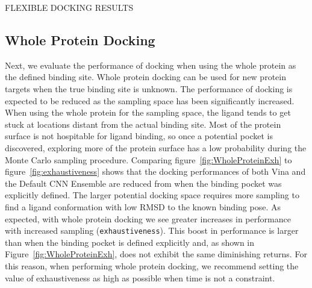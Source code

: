 \documentclass[journal=jcisd8,manuscript=article]{achemso}
\begin{document}
FLEXIBLE DOCKING RESULTS

\subsection{Whole Protein Docking}

Next, we evaluate the performance of docking when using the whole protein as the defined binding site. Whole protein docking can be used for new protein targets when the true binding site is unknown. The performance of docking is expected to be reduced as the sampling space has been significantly increased. When using the whole protein for the sampling space, the ligand  tends to get stuck at locations distant from the actual binding site. Most of the protein surface is not hospitable for ligand binding, so once a potential pocket is discovered, exploring more of the protein surface has a low probability during the Monte Carlo sampling procedure. Comparing figure~\ref{fig:WholeProteinExh} to figure~\ref{fig:exhaustiveness} shows that the docking performances of both Vina and the Default CNN Ensemble are reduced from when the binding pocket was explicitly defined.  The larger potential docking space requires more sampling to find a ligand conformation with low RMSD to the known binding pose. As expected, with whole protein docking we see greater increases in performance with increased sampling (\texttt{exhaustiveness}). This boost in performance is larger than when the binding pocket is defined explicitly and, as shown in Figure~\ref{fig:WholeProteinExh}, does not exhibit the same diminishing returns. For this reason, when performing whole protein docking, we recommend setting the value of exhaustiveness as high as possible when time is not a constraint.
\end{document}
